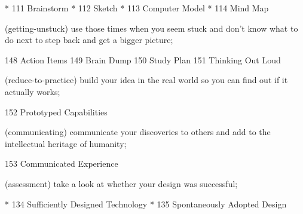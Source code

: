 *	111  Brainstorm
*	112  Sketch
*	113  Computer Model
*	114  Mind Map

(getting-unstuck) use those times when you seem stuck and don't know what to do next to step back and get a bigger picture;

	148  Action Items
	149  Brain Dump
	150  Study Plan
	151  Thinking Out Loud

(reduce-to-practice) build your idea in the real world so you can find out if it actually works;

	152  Prototyped Capabilities

(communicating) communicate your discoveries to others and add to the intellectual heritage of humanity;

	153  Communicated Experience

(assessment) take a look at whether your design was successful;

*	134  Sufficiently Designed Technology
*	135  Spontaneously Adopted Design
